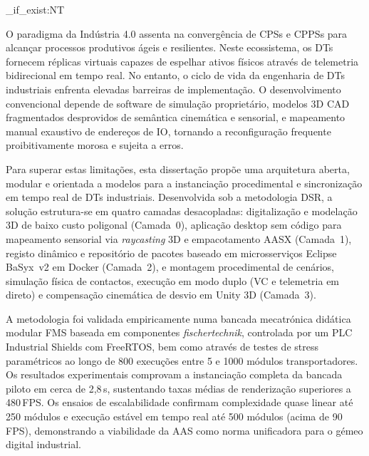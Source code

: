 
\ExplSyntaxOn
\cs_if_exist:NT \TitleOnHeader
  { \TitleOnHeader }
\ExplSyntaxOff

%

O paradigma da Indústria 4.0 assenta na convergência de \glspl{CPS} e \glspl{CPPS} para alcançar processos produtivos ágeis e resilientes. Neste ecossistema, os \glspl{DT} fornecem réplicas virtuais capazes de espelhar ativos físicos através de telemetria bidirecional em tempo real. No entanto, o ciclo de vida da engenharia de \glspl{DT} industriais enfrenta elevadas barreiras de implementação. O desenvolvimento convencional depende de software de simulação proprietário, modelos 3D \gls{CAD} fragmentados desprovidos de semântica cinemática e sensorial, e mapeamento manual exaustivo de endereços de \gls{IO}, tornando a reconfiguração frequente proibitivamente morosa e sujeita a erros.

Para superar estas limitações, esta dissertação propõe uma arquitetura aberta, modular e orientada a modelos para a instanciação procedimental e sincronização em tempo real de \glspl{DT} industriais. Desenvolvida sob a metodologia \gls{DSR}, a solução estrutura-se em quatro camadas desacopladas: digitalização e modelação 3D de baixo custo poligonal (Camada~0), aplicação desktop sem código para mapeamento sensorial via \textit{raycasting} 3D e empacotamento \gls{AASX} (Camada~1), registo dinâmico e repositório de pacotes baseado em microsserviços Eclipse BaSyx~v2 em Docker (Camada~2), e montagem procedimental de cenários, simulação física de contactos, execução em modo duplo (\gls{VC} e telemetria em direto) e compensação cinemática de desvio em Unity 3D (Camada~3).

A metodologia foi validada empiricamente numa bancada mecatrónica didática modular \gls{FMS} baseada em componentes \textit{fischertechnik}, controlada por um \gls{PLC} Industrial Shields com FreeRTOS, bem como através de testes de stress paramétricos ao longo de 800 execuções entre 5 e 1000 módulos transportadores. Os resultados experimentais comprovam a instanciação completa da bancada piloto em cerca de 2{,}8\,s, sustentando taxas médias de renderização superiores a 480\,\gls{FPS}. Os ensaios de escalabilidade confirmam complexidade quase linear até 250 módulos e execução estável em tempo real até 500 módulos (acima de 90\,\gls{FPS}), demonstrando a viabilidade da \gls{AAS} como norma unificadora para o gémeo digital industrial.

